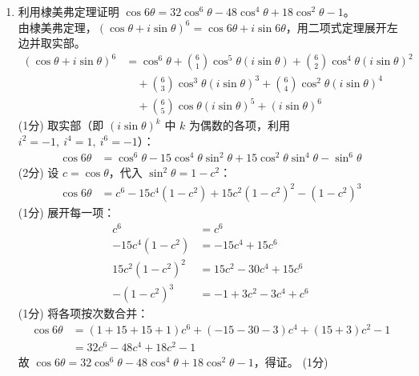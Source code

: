 \documentclass[12pt,a4paper]{exam-zh}
\newcommand{\solutionlayout}{%
    \setlength{\abovedisplayskip}{0.6em}%
    \setlength{\belowdisplayskip}{0.6em}%
    \setlength{\abovedisplayshortskip}{0.35em}%
    \setlength{\belowdisplayshortskip}{0.35em}%
    \setlength{\jot}{0.35em}%
}
\begin{document}
\begin{solution}
    \solutionlayout
    \begin{enumerate}[label=(\alph*),leftmargin=2.4em,itemsep=1em,topsep=0.5em,parsep=0.25em]
        \item 利用棣美弗定理证明 $\cos6\theta=32\cos^6\theta-48\cos^4\theta+18\cos^2\theta-1$。 \\
        由棣美弗定理，$(\cos\theta+i\sin\theta)^6=\cos6\theta+i\sin6\theta$，用二项式定理展开左边并取实部。
        \begin{align*}
            (\cos\theta+i\sin\theta)^6
            &= \cos^6\theta + \binom{6}{1}\cos^5\theta(i\sin\theta) + \binom{6}{2}\cos^4\theta(i\sin\theta)^2 \\
            &\quad + \binom{6}{3}\cos^3\theta(i\sin\theta)^3 + \binom{6}{4}\cos^2\theta(i\sin\theta)^4 \\
            &\quad + \binom{6}{5}\cos\theta(i\sin\theta)^5 + (i\sin\theta)^6
        \end{align*}
        \hfill (1分)
        取实部（即 $(i\sin\theta)^k$ 中 $k$ 为偶数的各项，利用 $i^2=-1,\ i^4=1,\ i^6=-1$）：
        \begin{align*}
            \cos6\theta &= \cos^6\theta - 15\cos^4\theta\sin^2\theta + 15\cos^2\theta\sin^4\theta - \sin^6\theta
        \end{align*}
        \hfill (2分)
        设 $c=\cos\theta$，代入 $\sin^2\theta=1-c^2$：
        \begin{align*}
            \cos6\theta &= c^6 - 15c^4(1-c^2) + 15c^2(1-c^2)^2 - (1-c^2)^3
        \end{align*}
        \hfill (1分)
        展开每一项：
        \begin{align*}
            c^6 &= c^6 \\
            -15c^4(1-c^2) &= -15c^4+15c^6 \\
            15c^2(1-c^2)^2 &= 15c^2-30c^4+15c^6 \\
            -(1-c^2)^3 &= -1+3c^2-3c^4+c^6
        \end{align*}
        \hfill (1分)
        将各项按次数合并：
        \begin{align*}
            \cos6\theta &= (1+15+15+1)c^6 + (-15-30-3)c^4 + (15+3)c^2 - 1 \\
            &= 32c^6-48c^4+18c^2-1
        \end{align*}
        故 $\cos6\theta=32\cos^6\theta-48\cos^4\theta+18\cos^2\theta-1$，得证。
        \hfill (1分)


\end{enumerate}
\end{solution}
\end{document}
